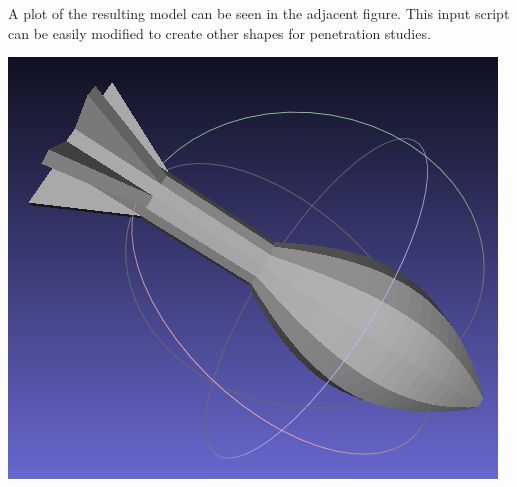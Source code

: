 \begin{minipage}[t]{0.5\textwidth}
A plot of the resulting model can be seen in the adjacent figure.  This input script can be 
easily modified to create other shapes for penetration studies.
\end{minipage}
\begin{minipage}[t]{0.5\textwidth}
  \vspace{0pt}
  \centering
  \includegraphics[width=0.9\columnwidth]{FIGS/geometry/mortar_shell.png}
\end{minipage}

